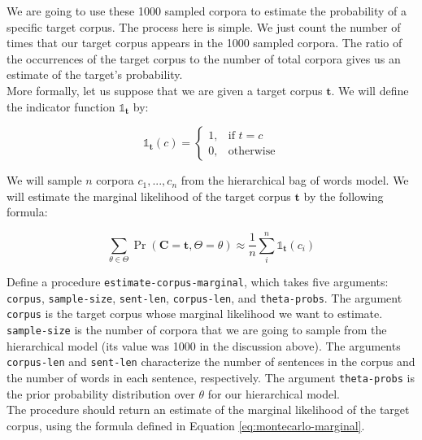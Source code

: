 \documentclass[10pt]{article}
\begin{document}
\noindent We are going to use these 1000 sampled corpora to estimate
the probability of a specific target corpus. The process here is
simple. We just count the number of times that our target corpus
appears in the 1000 sampled corpora. The ratio of the occurrences of
the target corpus to the number of total corpora gives us an estimate
of the target's probability.
\\

\noindent More formally, let us suppose that we are given a target corpus
$\mathbf{t}$. We will define the indicator function
$\mathds{1}_{\mathbf{t}}$ by:

\begin{equation}
\mathds{1}_{\mathbf{t}}(c) = 
\begin{cases}
    1,& \text{if } t = c\\
    0,              & \text{otherwise}
\end{cases}
\end{equation}

\noindent We will sample $n$ corpora $c_1,...,c_n$ from the hierarchical bag of
words model. We will estimate the marginal likelihood of the target
corpus $\mathbf{t}$ by the following formula:

\begin{equation}
\label{eq:montecarlo-marginal}
\sum_{\theta \in \Theta} \Pr(\mathbf{C}=\mathbf{t}, \Theta=\theta)  \approx \frac{1}{n} \sum_{i}^{n}\mathds{1}_{\mathbf{t}}(c_i) 
\end{equation}

\noindent Define a procedure \texttt{estimate-corpus-marginal}, which
takes five arguments: \texttt{corpus}, \texttt{sample-size},
\texttt{sent-len}, \texttt{corpus-len}, and \texttt{theta-probs}. The
argument \texttt{corpus} is the target corpus whose marginal
likelihood we want to estimate. \texttt{sample-size} is the number of
corpora that we are going to sample from the hierarchical model (its
value was 1000 in the discussion above). The arguments
\texttt{corpus-len} and \texttt{sent-len} characterize the number of
sentences in the corpus and the number of words in each sentence,
respectively. The argument \texttt{theta-probs} is the prior
probability distribution over $\theta$ for our hierarchical model.
\\

\noindent The procedure should return an estimate of the marginal
likelihood of the target corpus, using the formula defined in Equation
\ref{eq:montecarlo-marginal}.
\\
\end{document}
